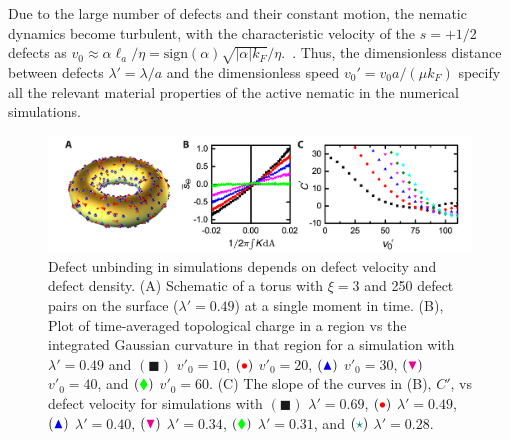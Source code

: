 Due to the large number of defects and their constant motion, the nematic dynamics become turbulent, with the characteristic velocity of the $s = +1/2$ defects as $v_0 \approx \alpha \ell_a/ \eta = \textrm{sign}(\alpha) \sqrt{|\alpha| k_F}/\eta$.~\cite{RN7, turbulentNematic}.
Thus, the dimensionless distance between defects $\lambda' = \lambda/a$ and the dimensionless speed $v_0' = v_0 a /(\mu k_F)$ specify all the relevant material properties of the active nematic in the numerical simulations.
\begin{figure}
  \centering
  \includegraphics{figures/C3/Ch3-Figs_SimDefectUnbinding.png}
  \caption{Defect unbinding in simulations depends on defect velocity and defect density.
  (A) Schematic of a torus with $\xi = 3$ and 250 defect pairs on the surface ($\lambda' = 0.49$) at a single moment in time.
  (B), Plot of time-averaged topological charge in a region vs the integrated Gaussian curvature  in that region for a simulation with $\lambda' = 0.49$ and
  $({\blacksquare})$ $v'_0 = 10$,
  $({\color{red} \bullet})$ $v'_0 = 20$,
  $({\color{blue} \blacktriangle})$ $v'_0 = 30$,
  $({\color{magenta} \blacktriangledown})$ $v'_0 = 40$, and
  $({\color{green} \blacklozenge})$ $v'_0 = 60$.
  (C) The slope of the curves in (B), $C'$, vs defect velocity for simulations with
  $({\blacksquare})$ $\lambda' = 0.69$,
  $({\color{red} \bullet})$ $\lambda' = 0.49$,
  $({\color{blue} \blacktriangle})$ $\lambda' = 0.40$,
  $({\color{magenta} \blacktriangledown})$ $\lambda' = 0.34$,
  $({\color{green} \blacklozenge})$ $\lambda' = 0.31$, and
  $({\color{teal} \star})$ $\lambda' = 0.28$.}\label{f:3-SimDefectUnbinding}
\end{figure}

